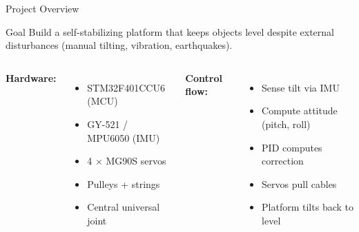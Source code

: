 \documentclass[10pt]{beamer}
\begin{document}
\begin{frame}{Project Overview}
  \begin{block}{Goal}
    Build a self-stabilizing platform that keeps objects level despite external disturbances (manual tilting, vibration, earthquakes).
  \end{block}

  \begin{columns}[T,onlytextwidth]
    \textbf{Hardware:}
    \begin{itemize}
      \item STM32F401CCU6 (MCU)
      \item GY-521 / MPU6050 (IMU)
      \item 4 $\times$ MG90S servos
      \item Pulleys + strings
      \item Central universal joint
    \end{itemize}

    \textbf{Control flow:}
    \begin{itemize}
      \item Sense tilt via IMU
      \item Compute attitude (pitch, roll)
      \item PID computes correction
      \item Servos pull cables
      \item Platform tilts back to level
    \end{itemize}
  \end{columns}
\end{frame}
\end{document}
